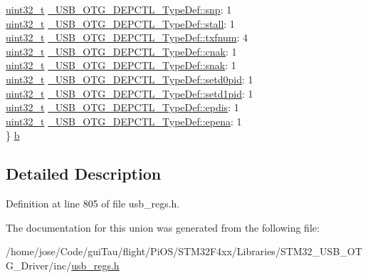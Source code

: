 \begin{DoxyCompactItemize}
\begin{tabbing}
\>\hyperlink{stdint_8h_a435d1572bf3f880d55459d9805097f62}{uint32\_t} \hyperlink{group___u_s_b___o_t_g___d_r_i_v_e_r_ga39db95db811c1ab0d6706d1105fc1875}{\_USB\_OTG\_DEPCTL\_TypeDef::snp}: 1\\
\>\hyperlink{stdint_8h_a435d1572bf3f880d55459d9805097f62}{uint32\_t} \hyperlink{group___u_s_b___o_t_g___d_r_i_v_e_r_gac6602ddfb32c5671ed755b9b4feebb82}{\_USB\_OTG\_DEPCTL\_TypeDef::stall}: 1\\
\>\hyperlink{stdint_8h_a435d1572bf3f880d55459d9805097f62}{uint32\_t} \hyperlink{group___u_s_b___o_t_g___d_r_i_v_e_r_ga44558e437642307114827cdb9ca99c90}{\_USB\_OTG\_DEPCTL\_TypeDef::txfnum}: 4\\
\>\hyperlink{stdint_8h_a435d1572bf3f880d55459d9805097f62}{uint32\_t} \hyperlink{group___u_s_b___o_t_g___d_r_i_v_e_r_ga3e56a457c5ef0c5073133f6136baef92}{\_USB\_OTG\_DEPCTL\_TypeDef::cnak}: 1\\
\>\hyperlink{stdint_8h_a435d1572bf3f880d55459d9805097f62}{uint32\_t} \hyperlink{group___u_s_b___o_t_g___d_r_i_v_e_r_ga12a5b369b36732e560b814f77a5b4f28}{\_USB\_OTG\_DEPCTL\_TypeDef::snak}: 1\\
\>\hyperlink{stdint_8h_a435d1572bf3f880d55459d9805097f62}{uint32\_t} \hyperlink{group___u_s_b___o_t_g___d_r_i_v_e_r_ga5352bfdd79679f5fba2e20e336c0d48f}{\_USB\_OTG\_DEPCTL\_TypeDef::setd0pid}: 1\\
\>\hyperlink{stdint_8h_a435d1572bf3f880d55459d9805097f62}{uint32\_t} \hyperlink{group___u_s_b___o_t_g___d_r_i_v_e_r_gad8a3a72618af4a2c5134a74458fae380}{\_USB\_OTG\_DEPCTL\_TypeDef::setd1pid}: 1\\
\>\hyperlink{stdint_8h_a435d1572bf3f880d55459d9805097f62}{uint32\_t} \hyperlink{group___u_s_b___o_t_g___d_r_i_v_e_r_gab79051b0a8cc476d1e35fe02598a7989}{\_USB\_OTG\_DEPCTL\_TypeDef::epdis}: 1\\
\>\hyperlink{stdint_8h_a435d1572bf3f880d55459d9805097f62}{uint32\_t} \hyperlink{group___u_s_b___o_t_g___d_r_i_v_e_r_ga6cdb48720ad4a0114da47efd4055860b}{\_USB\_OTG\_DEPCTL\_TypeDef::epena}: 1\\
\} \hyperlink{group___u_s_b___o_t_g___d_r_i_v_e_r_ga325a0c69d8ae83eea6cff9ae06669272}{b}\\

\end{tabbing}\end{DoxyCompactItemize}


\subsection{Detailed Description}


Definition at line 805 of file usb\-\_\-regs.\-h.



The documentation for this union was generated from the following file\-:\begin{DoxyCompactItemize}
\item 
/home/jose/\-Code/gui\-Tau/flight/\-Pi\-O\-S/\-S\-T\-M32\-F4xx/\-Libraries/\-S\-T\-M32\-\_\-\-U\-S\-B\-\_\-\-O\-T\-G\-\_\-\-Driver/inc/\hyperlink{_s_t_m32_f4xx_2_libraries_2_s_t_m32___u_s_b___o_t_g___driver_2inc_2usb__regs_8h}{usb\-\_\-regs.\-h}\end{DoxyCompactItemize}
